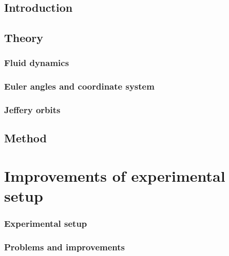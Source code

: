 \documentclass[]{report}
\begin{document}


\doublespacing



\newpage
{}
\setcounter{page}{1}
\pagestyle{fancy}
\setspecialhdr
\tableofcontents


\newpage
\setdefaulthdr
{}	
\setcounter{page}{1}

\chapter{Introduction}



\chapter{Theory}

\section{Fluid dynamics}


\section{Euler angles and coordinate system}


\section{Jeffery orbits}


\chapter{Method}
\part{Improvements of experimental setup}



\section{Experimental setup}

\section{Problems and improvements}

\end{document}
